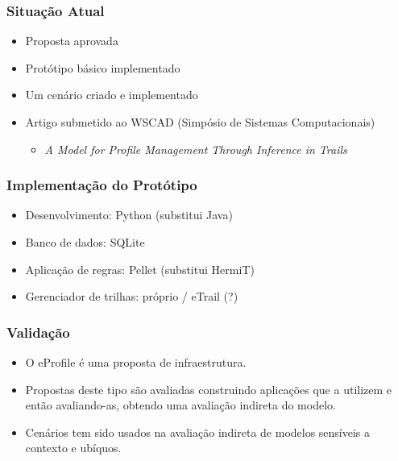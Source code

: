 \documentclass[14pt]{beamer}
\begin{document}

\begin{frame}
  \frametitle{Situação Atual}
  \begin{itemize}
    \item Proposta aprovada
    \item Protótipo básico implementado
    \item Um cenário criado e implementado
    \item Artigo submetido ao WSCAD (Simpósio de Sistemas Computacionais)
    \begin{itemize}
      \item {\em A Model for Profile Management Through Inference in Trails}
    \end{itemize}
  \end{itemize}
\end{frame}


\begin{frame}
  \frametitle{Implementação do Protótipo}
  \begin{itemize}
    \item Desenvolvimento: Python (substitui Java)
    \item Banco de dados: SQLite
    \item Aplicação de regras: Pellet (substitui HermiT)
    \item Gerenciador de trilhas: próprio / eTrail (?)
  \end{itemize}
\end{frame}


\begin{frame}
  \frametitle{Validação}
  \begin{itemize}
    \item O eProfile é uma proposta de infraestrutura.
    \item Propostas deste tipo são avaliadas construindo aplicações que a utilizem e então avaliando-as, obtendo uma avaliação indireta do modelo.
    \item Cenários tem sido usados na avaliação indireta de modelos sensíveis a contexto e ubíquos.
  \end{itemize}
\end{frame}

\end{document}
